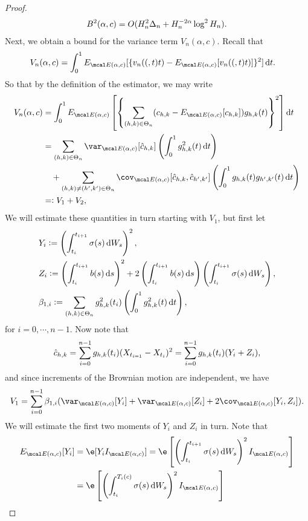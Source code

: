 \begin{appendices}
\begin{proof}
\begin{align}
  B^2(\alpha,c) =  O(H_n^2 \Delta_n  + H_n^{-2\alpha}\log^2 H_n).\notag
  \label{}
\end{align}
Next, we obtain a  bound for the variance term $V_n(\alpha, c)$. Recall that
\begin{align}
V_n(\alpha,c)  & =  \int_0^1 \eind[\{\svn(t) - \eind[\svn(t)]\}^2]  \D t.
\notag
\end{align}
So that by the definition of the estimator, we may write
\begin{align}
 V_n(\alpha,c) & =   \int_0^1\eind\left[\left\{\sumt (\chk -\eind[\chk])\ghk(t)\right\}^2 \right]\D t \notag\\
& =\sum_{(h,k) \in \Theta_n}\varind[\cnhk]\left( \int_0^1 g_{h,k}^2(t) \D t\right)\notag \\
& \quad + \sum_{(h,k) \ne (h',k') \in \Theta_n} \covind[\cnhk, \hat{c}_{h',k'}]\left( \int_0^1 g_{h,k}(t) g_{h',k'}(t)\D t\right) \notag\\
& =: V_1 + V_2,
\end{align}
 We will estimate these quantities in turn starting with $V_1$, but first let  
\begin{align}
  &Y_i := \left(\int^{t_{i+1}}_{t_i} \sigma(s) \D W_s\right)^2 ,\notag\\
  &Z_i := \left(\int^{t_{i+1}}_{t_i} b(s) \D s\right)^2 + 2\left(\int^{t_{i+1}}_{t_i} b(s) \D s\right)\left(\int^{t_{i+1}}_{t_i} \sigma(s) \D W_s\right), \notag\\ 
  &\beta_{1,i} := \sum_{(h,k) \in \Theta_n} g^2_{h,k}(t_i)\left( \int_0^1 g_{h,k}^2(t) \D t\right),\notag
  \label{}
\end{align}
for $i = 0,\cdots, n-1$. Now note that 
\begin{align}
  \hat{c}_{h,k} = \sum_{i = 0}^{n-1} g_{h,k}(t_i) (X_{t_{i=1}} - X_{t_i})^2 = \sum_{i = 0}^{n-1} g_{h,k}(t_i) (Y_i + Z_i),\notag
  \label{}
\end{align}
and  since  increments of the Brownian motion are independent, we have
\begin{align}
  V_{1} = \sum_{i = 0}^{n-1} \beta_{1,i} (\varind[Y_i] + \varind[Z_i] + 2 \covind[Y_i,Z_i]). \notag
  \label{}
\end{align}
We will estimate the first two moments of $Y_i$ and $Z_i$ in turn. Note that  
\begin{align}
  \eind[Y_i] &= \e[Y_i \indvol] = \e\left[ \left(\int^{t_{i+1}}_{t_i} \sigma(s) \D W_s\right)^2\indvol\right]\notag\\
&=\e\left[ \left(\int^{T_i(c)}_{t_i} \sigma(s) \D W_s\right)^2\indvol\right] \notag\\

\end{align}
\end{proof}
\end{appendices}
